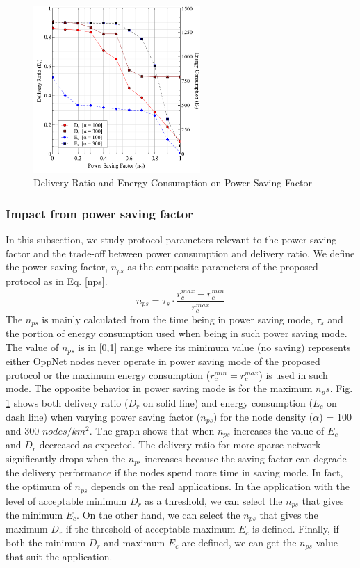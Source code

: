 \begin{figure}[!t]
\centering
\includegraphics[width=2.5in]{Graphs/NpsDeliveryPerformanceAndDeliveryRatio.pdf}
\caption{Delivery Ratio and Energy Consumption on Power Saving Factor}
\label{The Optimum between Delivery Ratio and protocol Performance}
\end{figure}

\subsubsection{Impact from power saving factor}

In this subsection, we study protocol parameters relevant to the power saving factor and the trade-off between power consumption and delivery ratio.
%
We define the power saving factor, $n_{ps}$ as the composite parameters of the proposed protocol as in Eq. \ref{nps}.
%
\begin{equation}
{ n }_{ ps }={ \tau  }_{ s }\cdot \frac { { r }_{ c }^{ max }-{ r }_{ c }^{ min } }{ { r }_{ c }^{ max } } 
\label{nps}
\end{equation}
The $n_{ps}$ is mainly calculated from the time being in power saving mode, $\tau_s$ and the portion of energy consumption used when being in such power saving mode.
%
The value of $n_{ps}$ is in [0,1] range where its minimum value (no saving) represents either OppNet nodes never operate in power saving mode of the proposed protocol or the maximum energy consumption ($r_c^{min} = r_c^{max}$) is used in such mode.
%
The opposite behavior in power saving mode is for the maximum $n_ps$.
%
Fig. \ref{The Optimum between Delivery Ratio and protocol Performance} shows both delivery ratio ($D_r$ on solid line) and energy consumption ($E_c$ on dash line) when varying power saving factor ($n_{ps}$) for the node density ($\alpha$) = 100 and 300 $nodes/km^2$.
%
The graph shows that when $n_{ps}$ increases the value of $E_c$ and $D_r$ decreased as expected.
%
The delivery ratio for more sparse network significantly drops when the $n_{ps}$ increases because the saving factor can degrade the delivery performance if the nodes spend more time in saving mode.
%
In fact, the optimum of $n_{ps}$ depends on the real applications.
%
In the application with the level of acceptable minimum $D_r$ as a threshold, we can select the $n_{ps}$ that gives the minimum $E_c$.
%
On the other hand, we can select the $n_{ps}$ that gives the maximum $D_r$ if the threshold of acceptable maximum $E_c$ is defined.
%
Finally, if both the minimum $D_r$ and maximum $E_c$ are defined, we can get the $n_{ps}$ value that suit the application.

